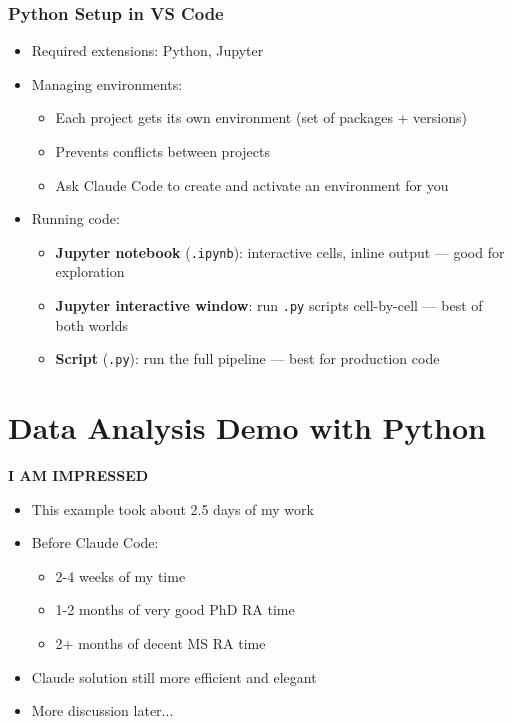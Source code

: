 \documentclass[aspectratio=169, 12pt]{beamer}
\begin{document}
\begin{frame}
\frametitle{Python Setup in VS Code}
\begin{itemize}
    \item Required extensions: Python, Jupyter
    \item Managing environments:
        \begin{itemize}
            \item[$\circ$] Each project gets its own environment (set of packages + versions)
            \item[$\circ$] Prevents conflicts between projects
            \item[$\circ$] Ask Claude Code to create and activate an environment for you
        \end{itemize}
    \item Running code:
        \begin{itemize}
            \item[$\circ$] \textbf{Jupyter notebook} (\texttt{.ipynb}): interactive cells, inline output --- good for exploration
            \item[$\circ$] \textbf{Jupyter interactive window}: run \texttt{.py} scripts cell-by-cell --- best of both worlds
            \item[$\circ$] \textbf{Script} (\texttt{.py}): run the full pipeline --- best for production code
        \end{itemize}
\end{itemize}
\end{frame}


\section{Data Analysis Demo with Python \vspace{0.3in}}


\begin{frame}
    \begin{center}
        \color{red}\bf I AM IMPRESSED
    \end{center}
    \pause
    \begin{itemize}
        \item This example took about 2.5 days of my work
        \item Before Claude Code:  
        \begin{itemize}
            \item 2-4 weeks of my time
            \item 1-2 months of very good PhD RA time
            \item 2+ months of decent MS RA time
        \end{itemize}
        \item Claude solution still more efficient and elegant
        \item More discussion later...
    \end{itemize}
\end{frame}
\end{document}
